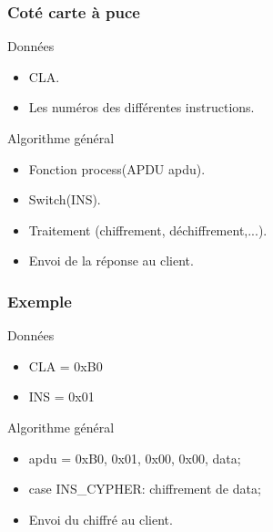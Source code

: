 \documentclass{beamer}
\begin{document}
\begin{frame}
	\frametitle{Coté carte à puce}
	\begin{block}{Données}
		\begin{itemize}
			\item CLA.
			\item Les numéros des différentes instructions.
		\end{itemize}		
	\end{block}
	\begin{block}{Algorithme général}
		\begin{itemize}
			\item Fonction process(APDU apdu).
			\item Switch(INS).
			\item Traitement (chiffrement, déchiffrement,...).
			\item Envoi de la réponse au client.
		\end{itemize}
	\end{block}
\end{frame}

\begin{frame}
	\frametitle{Exemple}
	\begin{exampleblock}{Données}
        \begin{itemize}
            \item CLA = 0xB0
            \item INS = 0x01
        \end{itemize}
	\end{exampleblock}

	\begin{exampleblock}{Algorithme général}
        \begin{itemize}
            \item apdu = 0xB0, 0x01, 0x00, 0x00, data;
            \item case INS\_CYPHER: chiffrement de data;
		    \item Envoi du chiffré au client.
        \end{itemize}
	\end{exampleblock}
\end{frame}

	
\end{document}
